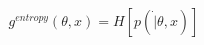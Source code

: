 \documentclass[preview]{standalone}
\begin{document}
\begin{align*}
g^{entropy}(\theta, x) = H[p(\dot|\theta, x)]
\end{align*}
\end{document}
